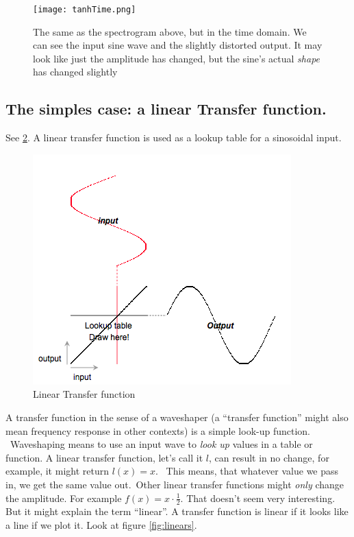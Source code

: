 \begin{figure}[h!]
	\centering
	\texttt{[image: tanhTime.png]}
	\caption[Distorted sine, time domain]
	{The same as the spectrogram above, but in the time domain. We can see the input sine wave and the slightly distorted output. It may look like just the amplitude has changed, but the sine's actual \textit{shape} has changed slightly}
	\label{fig:tanhTimeDom}
\end{figure}

\subsection{The simples case: a linear Transfer function. } %
\label{sub:linearTrans}
See \ref{fig:linfunct}. A linear transfer function is used as a lookup table for a sinosoidal input.

\begin{figure}[H]
	\begin{center}
		\includegraphics[scale = 1]{img/waveShapingVisual.png}
		\caption{Linear Transfer function}
		\label{fig:linfunct}
	\end{center}
\end{figure}
A transfer function in the sense of a waveshaper (a ``transfer function'' might also mean frequency response in other contexts) is a simple look-up function. \
Waveshaping means to use an input wave to \textit{look up} values in a table or function. A linear transfer function, let's call it $l$, can result in no change, for example, it might return $l(x)=x$. \
This means, that whatever value we pass in, we get the same value out.\
Other linear transfer functions might \textit{only} change the amplitude. For example $f(x)=x \cdot \frac{1}{2}$. That doesn't seem very interesting. But it might explain the term ``linear''. A transfer function is linear if it looks like a line if we plot it. Look at figure \ref{fig:linears}.

